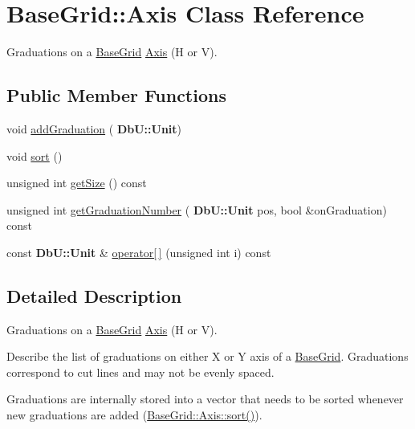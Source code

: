 \hypertarget{classKatabatic_1_1BaseGrid_1_1Axis}{}\section{Base\+Grid\+:\+:Axis Class Reference}
\label{classKatabatic_1_1BaseGrid_1_1Axis}


Graduations on a \hyperlink{classKatabatic_1_1BaseGrid}{Base\+Grid} \hyperlink{classKatabatic_1_1BaseGrid_1_1Axis}{Axis} (H or V).  


\subsection*{Public Member Functions}
\begin{DoxyCompactItemize}
\item 
void \hyperlink{classKatabatic_1_1BaseGrid_1_1Axis_ada526136545060f41e8b9228ce1c5895}{add\+Graduation} (\textbf{ Db\+U\+::\+Unit})
\item 
void \hyperlink{classKatabatic_1_1BaseGrid_1_1Axis_a47fdc9eea42b6975cdc835bb2e08810e}{sort} ()
\item 
unsigned int \hyperlink{classKatabatic_1_1BaseGrid_1_1Axis_a9be1e4285daa77fe397767c097fbdc66}{get\+Size} () const
\item 
unsigned int \hyperlink{classKatabatic_1_1BaseGrid_1_1Axis_a2a6bd524227130d8ccf482aa2c484a42}{get\+Graduation\+Number} (\textbf{ Db\+U\+::\+Unit} pos, bool \&on\+Graduation) const
\item 
const \textbf{ Db\+U\+::\+Unit} \& \hyperlink{classKatabatic_1_1BaseGrid_1_1Axis_a074a4f61306b88baac6bbf54b0b3212c}{operator\mbox{[}$\,$\mbox{]}} (unsigned int i) const
\end{DoxyCompactItemize}


\subsection{Detailed Description}
Graduations on a \hyperlink{classKatabatic_1_1BaseGrid}{Base\+Grid} \hyperlink{classKatabatic_1_1BaseGrid_1_1Axis}{Axis} (H or V). 

Describe the list of graduations on either X or Y axis of a \hyperlink{classKatabatic_1_1BaseGrid}{Base\+Grid}. Graduations correspond to cut lines and may not be evenly spaced.

Graduations are internally stored into a vector that needs to be sorted whenever new graduations are added (\hyperlink{classKatabatic_1_1BaseGrid_1_1Axis_a47fdc9eea42b6975cdc835bb2e08810e}{Base\+Grid\+::\+Axis\+::sort()}). 

